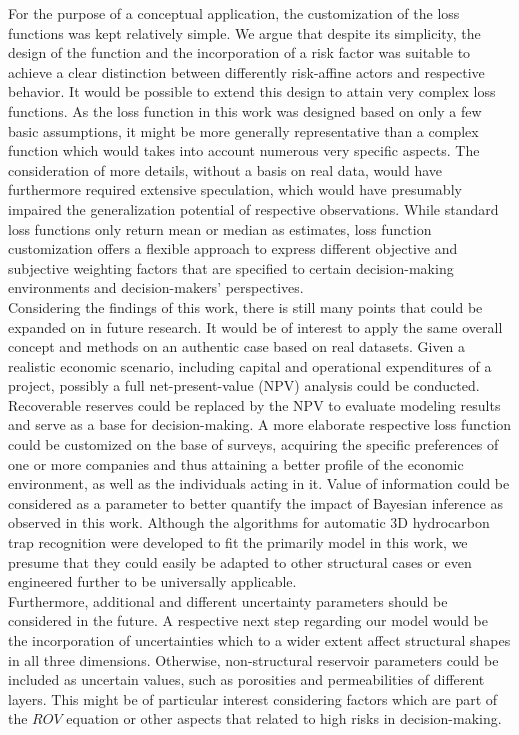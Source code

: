 	For the purpose of a conceptual application, the customization of the loss functions was kept relatively simple. We argue that despite its simplicity, the design of the function and the incorporation of a risk factor was suitable to achieve a clear distinction between differently risk-affine actors and respective behavior. It would be possible to extend this design to attain very complex loss functions. As the loss function in this work was designed based on only a few basic assumptions, it might be more generally representative than a complex function which would takes into account numerous very specific aspects. The consideration of more details, without a basis on real data, would have furthermore required extensive speculation, which would have presumably impaired the generalization potential of respective observations. While standard loss functions only return mean or median as estimates, loss function customization offers a flexible approach to express different objective and subjective weighting factors that are specified to certain decision-making environments and decision-makers' perspectives.\\	
	Considering the findings of this work, there is still many points that could be expanded on in future research. It would be of interest to apply the same overall concept and methods on an authentic case based on real datasets. Given a realistic economic scenario, including capital and operational expenditures of a project, possibly a full net-present-value (NPV) analysis could be conducted. Recoverable reserves could be replaced by the NPV to evaluate modeling results and serve as a base for decision-making. A more elaborate respective loss function could be customized on the base of surveys, acquiring the specific preferences of one or more companies and thus attaining a better profile of the economic environment, as well as the individuals acting in it. Value of information could be considered as a parameter to better quantify the impact of Bayesian inference as observed in this work.
	Although the algorithms for automatic 3D hydrocarbon trap recognition were developed to fit the primarily model in this work, we presume that they could easily be adapted to other structural cases or even engineered further to be universally applicable.\\
	Furthermore, additional and different uncertainty parameters should be considered in the future. A respective next step regarding our model would be the incorporation of uncertainties which to a wider extent affect structural shapes in all three dimensions. Otherwise, non-structural reservoir parameters could be included as uncertain values, such as porosities and permeabilities of different layers. This might be of particular interest considering factors which are part of the $ROV$ equation or other aspects that related to high risks in decision-making.\\
